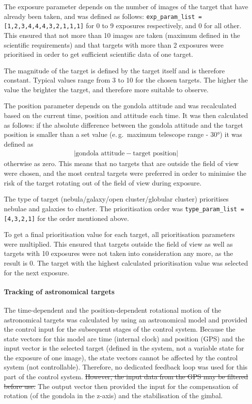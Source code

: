 The exposure parameter depends on the number of images of the target that have already been taken, and was defined as follows: \texttt{exp\_param\_list = [1,2,3,4,4,4,3,2,1,1,1]} for 0 to 9 exposures respectively, and 0 for all other. This ensured that not more than 10 images are taken (maximum defined in the scientific requirements) and that targets with more than 2 exposures were prioritised in order to get sufficient scientific data of one target.

The magnitude of the target is defined by the target itself and is therefore constant. Typical values range from 3 to 10 for the chosen targets. The higher the value the brighter the target, and therefore more suitable to observe.

The position parameter depends on the gondola attitude and was recalculated based on the current time, position and attitude each time. It was then calculated as follows: if the absolute difference between the gondola attitude and the target position is smaller than a set value (e.\,g.~maximum telescope range - $\ang{30}$) it was defined as 
\begin{align*}
    \left|\text{gondola attitude} - \text{target position} \right|
\end{align*}
otherwise as zero. This means that no targets that are outside the field of view were chosen, and the most central targets were preferred in order to minimise the risk of the target rotating out of the field of view during exposure.

The type of target (nebula/galaxy/open cluster/globular cluster) prioritises nebulae and galaxies to cluster. The prioritisation order was \texttt{type\_param\_list = [4,3,2,1]} for the order mentioned above.

To get a final prioritisation value for each target, all prioritisation parameters were multiplied. This ensured that targets outside the field of view as well as targets with 10 exposures were not taken into consideration any more, as the result is 0. The target with the highest calculated prioritisation value was selected for the next exposure.



\paragraph{Tracking of astronomical targets}

The time-dependent and the position-dependent rotational motion of the astronomical targets was calculated by using an astronomical model and provided the control input for the subsequent stages of the control system. Because the state vectors for this model are time (internal clock) and position (GPS) and the input vector is the selected target (defined in the system, not a variable state for the exposure of one image), the state vectors cannot be affected by the control system (not controllable). Therefore, no dedicated feedback loop was used for this part of the control system. \st{However, the input data from the GPS may be filtered before use.} The output vector then provided the input for the compensation of rotation (of the gondola in the z-axis) and the stabilisation of the gimbal.

